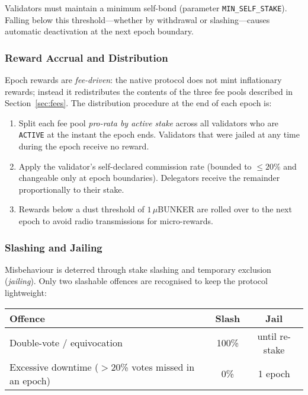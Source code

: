 \documentclass{article}
\begin{document}
Validators must maintain a minimum self-bond (parameter \texttt{MIN\_SELF\_STAKE}).  Falling below this threshold—whether by withdrawal or slashing—causes automatic deactivation at the next epoch boundary.

\subsubsection{Reward Accrual and Distribution}
\label{sec:stake_rewards}

Epoch rewards are \emph{fee-driven}: the native protocol does not mint inflationary rewards; instead it redistributes the contents of the three fee pools described in Section~\ref{sec:fees}.  The distribution procedure at the end of each epoch is:

\begin{enumerate}
    \item Split each fee pool \emph{pro-rata by active stake} across all validators who are \texttt{ACTIVE} at the instant the epoch ends.  Validators that were jailed at any time during the epoch receive no reward.
    \item Apply the validator’s self-declared commission rate (bounded to $\le 20\%$ and changeable only at epoch boundaries).  Delegators receive the remainder proportionally to their stake.
    \item Rewards below a dust threshold of $1\,\mu$BUNKER are rolled over to the next epoch to avoid radio transmissions for micro-rewards.
\end{enumerate}

\subsubsection{Slashing and Jailing}
\label{sec:slashing}

Misbehaviour is deterred through stake slashing and temporary exclusion (\emph{jailing}).  Only two slashable offences are recognised to keep the protocol lightweight:

\begin{center}
\begin{tabular}{l c c}
\textbf{Offence} & \textbf{Slash} & \textbf{Jail}\;\\\hline
Double-vote / equivocation & 100\% & until re-stake \\
Excessive downtime ($>$20\% votes missed in an epoch) & 0\% & 1 epoch \\
\end{tabular}
\end{center}
\end{document}
